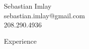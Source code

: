 \documentclass[9pt]{article}
\newenvironment{changemargin}[2]{%
  \begin{list}{}{%
    \setlength{\topsep}{0pt}%
    \setlength{\leftmargin}{#1}%
    \setlength{\rightmargin}{#2}%
    \setlength{\listparindent}{\parindent}%
    \setlength{\itemindent}{\parindent}%
    \setlength{\parsep}{\parskip}%
  }%
  \item[]}{\end{list}
}
\newcommand{\lineover}{
    \begin{changemargin}{-0.05in}{-0.05in}
        \vspace*{-8pt}
        \hrulefill \\
        \vspace*{-2pt}
    \end{changemargin}
}
\newcommand{\header}[1]{
    \begin{changemargin}{-0.5in}{-0.5in}
        {\large #1}\\
        \lineover
    \end{changemargin}
}
\newcommand{\contact}[4]{
    \begin{changemargin}{-0.5in}{-0.5in}
        \begin{center}
            {\Large {#1}}\\ \smallskip
            {#2}\\ \smallskip
            {#3}
        \end{center}
    \end{changemargin}
}
\newenvironment{body} {
    \vspace*{-16pt}
    \begin{changemargin}{-0.20in}{-0.5in}
  }
    {\end{changemargin}
}
\begin{document}
\contact{Sebastian Imlay}{sebastian.imlay@gmail.com}{208.290.4936}








%
%



\header{Experience}
\end{document}
